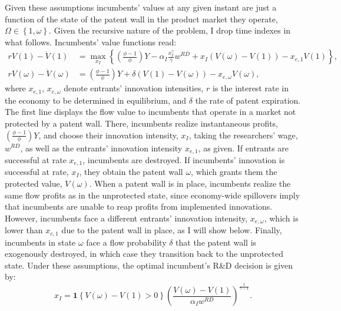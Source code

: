 Given these assumptions incumbents' values at any given instant are
just a function of the state of the patent wall in the product market
they operate, $\Omega\in\left\{ 1,\omega\right\} .$ Given the recursive
nature of the problem, I drop time indexes in what follows. Incumbents'
value functions read:
\begin{align}
rV(1)-\dot{V}(1) & =\max_{x_{I}}\left\{ \left(\frac{\phi-1}{\phi}\right)Y-\alpha_{I}\frac{x_{I}^{\gamma}}{\gamma}w^{RD}+x_{I}\left(V(\omega)-V(1)\right)-x_{e,1}V(1)\right\} ,\label{eq:v_1}\\
rV(\omega)-\dot{V}(\omega) & =\left(\frac{\phi-1}{\phi}\right)Y+\delta\left(V(1)-V(\omega)\right)-x_{e,\omega}V(\omega),\label{eq:v_om}
\end{align}
where $x_{e,1}$, $x_{e,\omega}$ denote entrants' innovation intensities,
$r$ is the interest rate in the economy to be determined in equilibrium,
and $\delta$ the rate of patent expiration. The first line displays
the flow value to incumbents that operate in a market not protected
by a patent wall. There, incumbents realize instantaneous profits,
$\left(\frac{\phi-1}{\phi}\right)Y$, and choose their innovation
intensity, $x_{I}$, taking the researchers' wage, $w^{RD}$, as well
as the entrants' innovation intensity $x_{e,1}$, as given. If entrants
are successful at rate $x_{e,1}$, incumbents are destroyed. If incumbents'
innovation is successful at rate, $x_{I}$, they obtain the patent
wall $\omega$, which grants them the protected value, $V(\omega)$.
When a patent wall is in place, incumbents realize the same flow profits
as in the unprotected state, since economy-wide spillovers imply that
incumbents are unable to reap profits from implemented innovations.
However, incumbents face a different entrants' innovation intensity,
$x_{e,\omega}$, which is lower than $x_{e,1}$ due to the patent
wall in place, as I will show below. Finally, incumbents in state
$\omega$ face a flow probability $\delta$ that the patent wall is
exogenously destroyed, in which case they transition back to the unprotected
state. Under these assumptions, the optimal incumbent's R\&D decision
is given by:
\begin{equation}
x_{I}=\bm{1}\left\{ V(\omega)-V(1)>0\right\} \left(\frac{V(\omega)-V(1)}{\alpha_{I}w^{RD}}\right)^{\frac{1}{\gamma-1}}.\label{eq:RD_I}
\end{equation}

